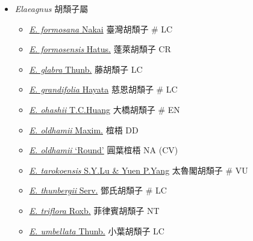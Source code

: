 
  \begin{itemize}
 \item[] \textit{Elaeagnus} 胡頹子屬
                                
  \begin{itemize}
        \item[] \href{http://www.theplantlist.org/tpl1.1/search?q=Elaeagnus+formosana}{\textit{E. formosana} Nakai}   臺灣胡頹子  \# LC
        \item[] \href{http://www.theplantlist.org/tpl1.1/search?q=Elaeagnus+formosensis}{\textit{E. formosensis} Hatus.}   蓬萊胡頹子   CR
        \item[] \href{http://www.theplantlist.org/tpl1.1/search?q=Elaeagnus+glabra}{\textit{E. glabra} Thunb.}   藤胡頹子   LC
        \item[] \href{http://www.theplantlist.org/tpl1.1/search?q=Elaeagnus+grandifolia}{\textit{E. grandifolia} Hayata}   慈恩胡頹子  \# LC
        \item[] \href{http://www.theplantlist.org/tpl1.1/search?q=Elaeagnus+ohashii}{\textit{E. ohashii} T.C.Huang}   大橋胡頹子  \# EN
        \item[] \href{http://www.theplantlist.org/tpl1.1/search?q=Elaeagnus+oldhamii}{\textit{E. oldhamii} Maxim.}   椬梧   DD
        \item[] \href{http://www.theplantlist.org/tpl1.1/search?q=Elaeagnus+oldhamii}{\textit{E. oldhamii} ‘Round’}   圓葉椬梧   NA (CV)
        \item[] \href{http://www.theplantlist.org/tpl1.1/search?q=Elaeagnus+tarokoensis}{\textit{E. tarokoensis} S.Y.Lu \& Yuen P.Yang}   太魯閣胡頹子  \# VU
        \item[] \href{http://www.theplantlist.org/tpl1.1/search?q=Elaeagnus+thunbergii}{\textit{E. thunbergii} Serv.}   鄧氏胡頹子  \# LC
        \item[] \href{http://www.theplantlist.org/tpl1.1/search?q=Elaeagnus+triflora}{\textit{E. triflora} Roxb.}   菲律賓胡頹子   NT
        \item[] \href{http://www.theplantlist.org/tpl1.1/search?q=Elaeagnus+umbellata}{\textit{E. umbellata} Thunb.}   小葉胡頹子   LC
  \end{itemize}
  \end{itemize}
